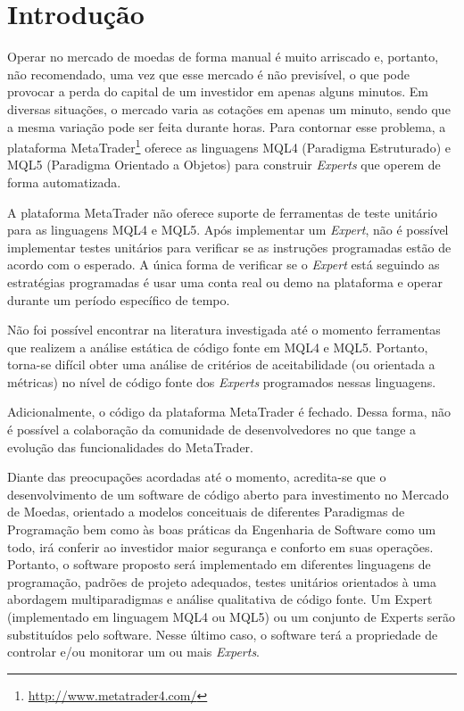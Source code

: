 \chapter{Introdução}

Operar no mercado de moedas de forma manual é muito arriscado e, portanto, não recomendado, uma vez que esse mercado é não previsível, o que pode provocar a perda do capital de um investidor em apenas alguns minutos. Em diversas situações, o mercado varia as cotações em apenas um minuto, sendo que a mesma variação pode ser feita durante horas. Para contornar esse problema, a plataforma MetaTrader\footnote{\url{http://www.metatrader4.com/}} oferece as linguagens MQL4 (Paradigma Estruturado) e MQL5 (Paradigma Orientado a Objetos) para construir \textit{Experts} que operem de forma automatizada. 

A plataforma MetaTrader não oferece suporte de ferramentas de teste unitário para as linguagens MQL4 e MQL5. Após implementar um \textit{Expert}, não é possível implementar testes unitários para verificar se as instruções programadas estão de acordo com o esperado. A única forma de verificar se o \textit{Expert} está seguindo as estratégias programadas é usar uma conta real ou demo na plataforma e operar durante um período específico de tempo.

Não foi possível encontrar na literatura investigada até o momento ferramentas que realizem a análise estática de código fonte em MQL4 e MQL5. Portanto, torna-se difícil obter uma análise de critérios de aceitabilidade (ou orientada a métricas) no nível de código fonte dos \textit{Experts} programados nessas linguagens.

Adicionalmente, o código da plataforma MetaTrader é fechado. Dessa forma, não é possível a colaboração da comunidade de desenvolvedores no que tange a evolução das funcionalidades do MetaTrader.

Diante das preocupações acordadas até o momento, acredita-se que o desenvolvimento de um software de código aberto para investimento no Mercado de Moedas, orientado a modelos conceituais de diferentes Paradigmas de Programação bem como às boas práticas da Engenharia de Software como um todo, irá conferir ao investidor maior segurança e conforto em suas operações. Portanto, o software proposto será implementado em diferentes linguagens de programação, padrões de projeto adequados, testes unitários orientados à uma abordagem multiparadigmas e análise qualitativa de código fonte. Um Expert (implementado em linguagem MQL4 ou MQL5) ou um conjunto de Experts serão substituídos pelo software. Nesse último caso, o software terá a propriedade de controlar e/ou monitorar um ou mais \textit{Experts}.

